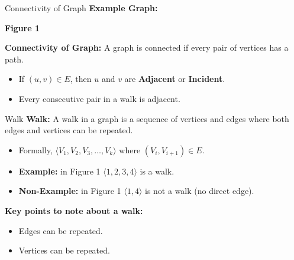 \documentclass{beamer}
\begin{document}
\begin{frame}{Connectivity of Graph}
    \textbf{Example Graph:}
    \begin{center}
        
        \vspace{0.3em}
        \textbf{Figure 1}
    \end{center}
    
    \textbf{Connectivity of Graph:} A graph is connected if every pair of vertices has a path.
    \begin{itemize}
        \item If $(u,v) \in E$, then $u$ and $v$ are \textbf{Adjacent} or \textbf{Incident}.
        \item Every consecutive pair in a walk is adjacent.
    \end{itemize}
\end{frame}

\begin{frame}{Walk}
    \textbf{Walk:} A walk in a graph is a sequence of vertices and edges where both edges and vertices can be repeated.
    \begin{itemize}
        \item Formally, $\langle V_1, V_2, V_3, \dots, V_k \rangle$ where $(V_i, V_{i+1}) \in E$.
        \item \textbf{Example:} in Figure 1 $\langle 1, 2, 3, 4 \rangle$ is a walk.
        \item \textbf{Non-Example:} in Figure 1 $\langle 1, 4 \rangle$ is not a walk (no direct edge).
    \end{itemize}
    \textbf{Key points to note about a walk:}
    \begin{itemize}
        \item Edges can be repeated.
        \item Vertices can be repeated.
    \end{itemize} \
\end{frame}
\end{document}
